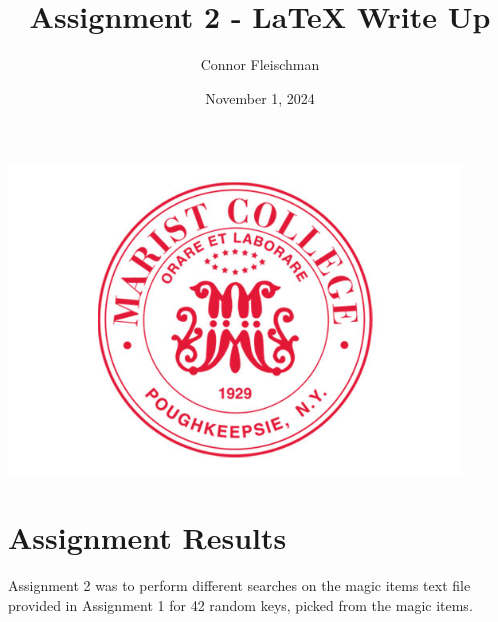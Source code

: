 \documentclass[12pt, letterpaper]{article}
\title{Assignment 2 - LaTeX Write Up}
\author{Connor Fleischman}
\date{November 1, 2024}
\begin{document}
\maketitle
\begin{center}
   \includegraphics[width=120mm,scale=0.5]{MaristSeal.png}
\end{center}
\newpage

\section{Assignment Results}
Assignment 2 was to perform different searches on the magic items text file provided in Assignment 1 for 42 random keys, picked from the magic items.
\end{document}
